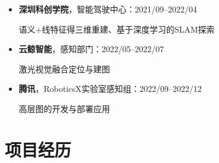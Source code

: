 \documentclass[11pt,a4paper,sans]{moderncv}        %
\begin{document}
\begin{itemize}

\item{\textbf{深圳科创学院}，智能驾驶中心：2021/09--2022/04}

语义+线特征得三维重建、基于深度学习的SLAM探索

\item{\textbf{云鲸智能}，感知部门：2022/05--2022/07}

激光视觉融合定位与建图

\item{\textbf{腾讯}，RoboticsX实验室感知组：2022/09--2022/12}

高层图的开发与部署应用

\end{itemize}

\section{项目经历}
\end{document}
